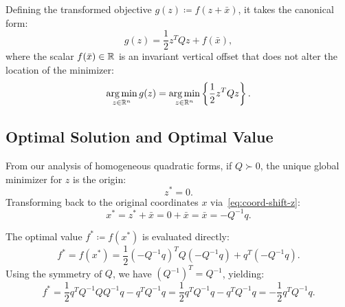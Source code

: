 Defining the transformed objective $g(z) \coloneqq f(z + \bar{x})$, it takes the canonical form:
\begin{equation}
    g(z) = \frac{1}{2} z^T Q z + f(\bar{x}),
\end{equation}
where the scalar $f(\bar{x}) \in \mathbb{R}$ is an invariant vertical offset that does not alter the location of the minimizer:
\begin{equation}
    \operatorname*{arg\,min}_{z \in \mathbb{R}^n} g(z) = \operatorname*{arg\,min}_{z \in \mathbb{R}^n} \left\{ \frac{1}{2} z^T Q z \right\}.
\end{equation}

\subsection{Optimal Solution and Optimal Value}
From our analysis of homogeneous quadratic forms, if $Q \succ 0$, the unique global minimizer for $z$ is the origin:
\begin{equation}
    z^* = 0.
\end{equation}
Transforming back to the original coordinates $x$ via~\eqref{eq:coord-shift-z}:
\begin{equation}
    x^* = z^* + \bar{x} = 0 + \bar{x} = \bar{x} = -Q^{-1} q.
\end{equation}

The optimal value $f^* \coloneqq f(x^*)$ is evaluated directly:
\begin{equation}
    f^* = f(x^*) = \frac{1}{2} (-Q^{-1} q)^T Q (-Q^{-1} q) + q^T (-Q^{-1} q).
\end{equation}
Using the symmetry of $Q$, we have $(Q^{-1})^T = Q^{-1}$, yielding:
\begin{equation}
    f^* = \frac{1}{2} q^T Q^{-1} Q Q^{-1} q - q^T Q^{-1} q = \frac{1}{2} q^T Q^{-1} q - q^T Q^{-1} q = -\frac{1}{2} q^T Q^{-1} q.
    \label{eq:optimal-value-non-singular}
\end{equation}

